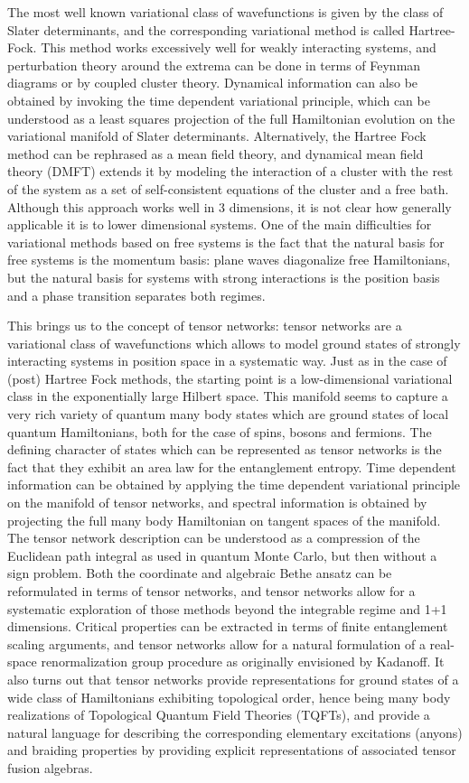 \documentclass[rmp,aps,reprint,superscriptaddress,nobalancelastpage]{revtex4-1}
\begin{document}
The most well known variational class of wavefunctions is given by the class of Slater determinants, and the corresponding variational method is called Hartree-Fock. This method works excessively well for weakly interacting systems, and perturbation theory around the extrema can be done in terms of Feynman diagrams or by coupled cluster theory. Dynamical information can also be obtained by invoking the time dependent variational principle, which can be understood as a least squares projection of the full Hamiltonian evolution on the variational manifold of Slater determinants. Alternatively, the Hartree Fock method can be rephrased as a mean field theory, and dynamical mean field theory (DMFT) extends it by modeling the interaction of a cluster with the rest of the system  as a set of self-consistent equations of the cluster and a free bath. Although this approach works well in 3 dimensions, it is not clear how generally applicable it is to lower dimensional systems. One of the main difficulties for variational methods based on free systems is the fact that the natural basis for free systems is the momentum basis: plane waves diagonalize free Hamiltonians, but the natural basis for systems with strong interactions is the position basis and a phase transition separates both regimes.

This brings us to the concept of tensor networks: tensor networks are a variational class of wavefunctions which allows to model ground states of strongly interacting systems in position space in a systematic way. Just as in the case of (post) Hartree Fock methods, the starting point is a low-dimensional variational class in the exponentially large Hilbert space. This manifold seems to capture a very rich variety of quantum many body states which are ground states of local quantum Hamiltonians, both for the case of spins, bosons and fermions. The defining character of states which can be represented as tensor networks is the fact that they exhibit an area law for the entanglement entropy. Time dependent information can be obtained by applying the time dependent variational principle on the manifold of tensor networks, and spectral information is obtained by projecting the full many body Hamiltonian on tangent spaces of the manifold. The tensor network description can be understood as a compression of the Euclidean path integral as used in quantum Monte Carlo, but then without a sign problem. Both the coordinate and algebraic Bethe ansatz can be reformulated in terms of tensor networks, and tensor networks allow for a systematic exploration of those methods beyond the integrable regime and 1+1 dimensions. Critical properties can be extracted in terms of finite entanglement scaling arguments, and tensor networks allow for a natural formulation of a real-space renormalization group procedure as originally envisioned by Kadanoff. It also turns out that tensor networks provide representations for ground states of a wide class of Hamiltonians exhibiting topological order, hence being many body realizations of Topological Quantum Field Theories (TQFTs), and provide a natural language for describing the corresponding elementary excitations (anyons) and braiding properties by providing explicit representations of associated tensor fusion algebras.
\end{document}
